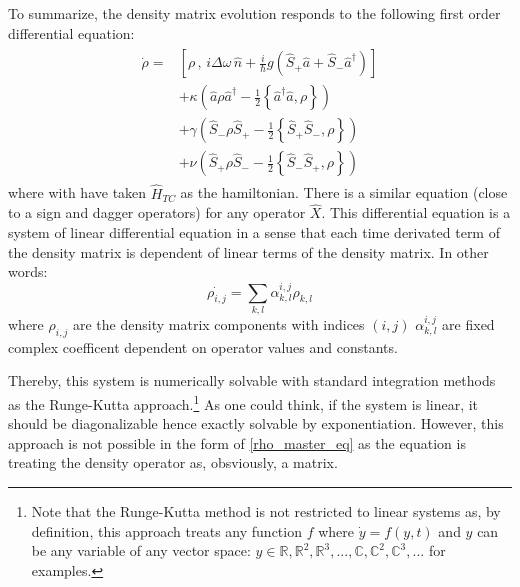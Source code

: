 \documentclass[12pt]{report}
\begin{document}
To summarize, the density matrix evolution responds to the following first order differential equation:
\begin{align}
\label{rho_master_eq}
\begin{split}
\dot{\rho} = &\left[ \rho \, , \, i\Delta\omega\,\hat{n} + \frac{i}{\hbar} g \left(\hat{S}_+ \hat{a} + \hat{S}_-\hat{a}^{\dag} \right)\right]\\
&+ \kappa \left( \hat{a} \rho \hat{a}^\dagger - \frac{1}{2} \left\lbrace \hat{a}^\dagger \hat{a}, \rho \right\rbrace \right)\\
&+ \gamma \left( \hat{S}_- \rho \hat{S}_+ - \frac{1}{2} \left\lbrace \hat{S}_+ \hat{S}_-, \rho \right\rbrace \right)\\
&+ \nu \left( \hat{S}_+ \rho \hat{S}_- - \frac{1}{2} \left\lbrace \hat{S}_- \hat{S}_+, \rho \right\rbrace \right)
\end{split}
\end{align}
where with have taken $\hat{H}_{TC}$ as the hamiltonian. There is a similar equation (close to a sign and dagger operators) for any operator $\hat{X}$. This differential equation is a system of linear differential equation in a sense that each time derivated term of the density matrix is dependent of linear terms of the density matrix. In other words:
\begin{equation}
\dot{\rho_{i,j}} = \sum_{k,l} \alpha_{k,l}^{i,j} \rho_{k,l}
\end{equation}
where $\rho_{i,j}$ are the density matrix components with indices $(i,j)$ $\alpha_{k,l}^{i,j}$ are fixed complex coefficent dependent on operator values and constants. 

Thereby, this system is numerically solvable with standard integration methods as the Runge-Kutta approach.\footnote{Note that the Runge-Kutta method is not restricted to linear systems as, by definition, this approach treats any function $f$ where $\dot{y} = f(y, t)$ and $y$ can be any variable of any vector space: $y \in \mathbb{R}, \mathbb{R}^2, \mathbb{R}^3, ..., \mathbb{C}, \mathbb{C}^2, \mathbb{C}^3, ...$ for examples.} As one could think, if the system is linear, it should be diagonalizable hence exactly solvable by exponentiation. However, this approach is not possible in the form of \eqref{rho_master_eq} as the equation is treating the density operator as, obsviously, a matrix. 
\end{document}
